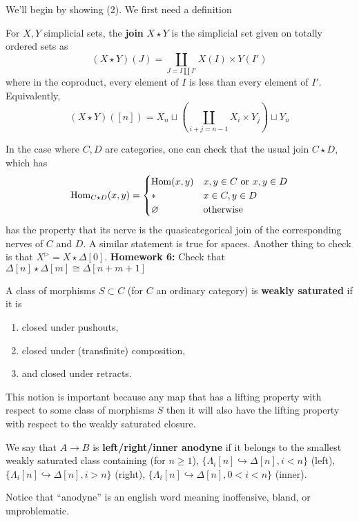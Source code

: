 \documentclass{amsart}
\begin{document}
We'll begin by showing (2). We first need a definition
\begin{definition}
    For $X,Y$ simplicial sets, the \textbf{join} $X\star Y$ is the simplicial set given on
    totally ordered sets as
    \begin{equation*}
        (X\star Y)(J) = \coprod_{J=I\coprod I'} X(I)\times Y(I')
    \end{equation*}
    where in the coproduct, every element of $I$ is less than every element of $I'$.
    Equivalently,
    \begin{equation*}
        (X\star Y)([n]) = X_n \sqcup \left( \coprod_{i+j=n-1}X_i\times Y_j \right)\sqcup Y_n
    \end{equation*}
\end{definition}
In the case where $C, D$ are categories, one can check that
the usual join $C\star D$, which has
\begin{equation*}
    \operatorname{Hom}_{C\star D}(x,y) =
    \begin{cases}
        \operatorname{Hom}(x,y) & x,y\in C\text{ or }x,y\in D \\
        * & x\in C, y\in D \\
        \varnothing & \text{otherwise}
    \end{cases}
\end{equation*}
has the property that its nerve is the quasicategorical join of the corresponding
nerves of $C$ and $D$. A similar statement is true for spaces.
Another thing to check is that $X^\triangleright=X\star \Delta[0]$.
\textbf{Homework 6:} Check that $\Delta[n]\star\Delta[m]\cong \Delta[n+m+1]$
\begin{definition}
    A class of morphisms $S\subset C$ (for $C$ an ordinary category) is \textbf{weakly saturated}
    if it is
    \begin{enumerate}
        \item closed under pushouts,
        \item closed under (transfinite) composition,
        \item and closed under retracts.
    \end{enumerate}
\end{definition}
This notion is important because any map that has a lifting property with respect
to some class of morphisms $S$ then it will also have the lifting property with respect to 
the weakly saturated closure.

\begin{definition}
    We say that $A\to B$ is \textbf{left/right/inner anodyne} if it belongs to
    the smallest weakly saturated class containing (for $n\geq 1$),
    $\{\Lambda_i[n]\hookrightarrow \Delta[n], i<n\}$ (left),
    $\{\Lambda_i[n]\hookrightarrow \Delta[n], i>n\}$ (right),
    $\{\Lambda_i[n]\hookrightarrow \Delta[n], 0<i<n\}$ (inner).
\end{definition}
Notice that ``anodyne'' is an english word meaning inoffensive, bland,
or unproblematic.
\end{document}
